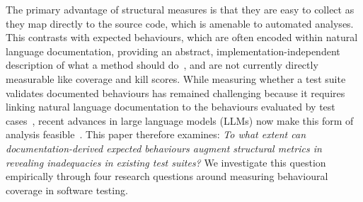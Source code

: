 
The primary advantage of structural measures is that they are easy to collect as they map directly to the source code, which is amenable to automated analyses. 
This contrasts with expected behaviours, which are 
often encoded within natural language documentation, providing an abstract, implementation-independent description of what a method should do~\cite{hossain2025doc2oracllinvestigatingimpactdocumentation}, and are not currently directly measurable like coverage and kill scores. 
While measuring whether a test suite validates documented behaviours has remained challenging because it requires linking natural language documentation to the behaviours evaluated by test cases~\cite{lee2025metamon}, 
recent advances in large language models (LLMs) now make this form of analysis feasible~\cite{Endres2023CanLL}. 
This paper therefore examines: \textit{To what extent can documentation-derived expected behaviours augment structural metrics in revealing  
inadequacies 
in existing test suites?}
We investigate this question empirically through four research questions around measuring behavioural coverage in software testing.

